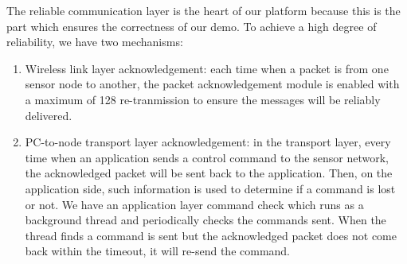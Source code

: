 The reliable communication layer is the heart of our platform because this is the part which ensures the correctness of our demo. To achieve a high degree of reliability, we have two mechanisms:

\begin{enumerate}
  \item Wireless link layer acknowledgement: each time when a packet is from one sensor node to another, the packet acknowledgement module is enabled with a maximum of 128 re-tranmission to ensure the messages will be reliably delivered.
  \item PC-to-node transport layer acknowledgement: in the transport layer, every time when an application sends a control command to the sensor network, the acknowledged packet will be sent back to the application. Then, on the application side, such information is used to determine if a command is lost or not. We have an application layer command check which runs as a background thread and periodically checks the commands sent. When the thread finds a command is sent but the acknowledged packet does not come back within the timeout, it will re-send the command.
\end{enumerate}
